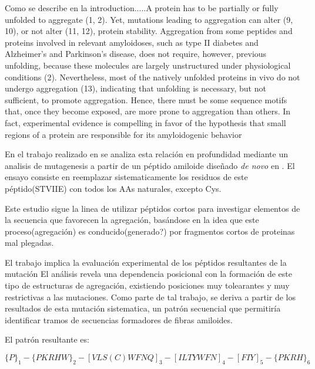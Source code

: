 Como se describe en la introduction.....A protein has to be partially or fully unfolded to aggregate (1, 2).
Yet, mutations leading to aggregation can alter (9, 10), or not alter (11, 12), protein stability. 
Aggregation from some peptides and proteins involved in relevant amyloidoses, such as type II diabetes and Alzheimer’s and Parkinson’s disease, does not require, however, previous unfolding, because these molecules are largely
unstructured under physiological conditions (2). 
Nevertheless, most of the natively unfolded proteins in vivo do not undergo aggregation (13), indicating that unfolding is necessary, but not sufficient, to promote aggregation. 
Hence, there must be some sequence motifs that, once they become exposed, are more prone to aggregation than others. 
In fact, experimental evidence is compelling in favor of the hypothesis that small regions of a protein are responsible for its amyloidogenic behavior

En el trabajo realizado en \cite{de2004sequence} se analiza esta relación %
en profundidad mediante un analisis de mutagenesis a partir de un péptido amiloide diseñado \textit{de novo} en \cite{de2002novo}. 
El ensayo consiste en reemplazar sistematicamente los residuos de este péptido(STVIIE) con todos los AAs naturales, excepto Cys.

Este estudio sigue la linea de utilizar péptidos cortos para investigar elementos de la secuencia que favorecen la agregación, 
basándose en la idea que este proceso(agregación) es conducido(generado?) por fragmentos cortos de proteinas mal plegadas.

El trabajo implica la evaluación experimental de los péptidos resultantes de la mutación
El análisis revela una dependencia posicional con la formación de este tipo de estructuras de agregación, existiendo posiciones muy tolearantes y muy restrictivas a las mutaciones.
Como parte de tal trabajo, se deriva a partir de los resultados de esta mutación sistematica, un patrón secuencial que permitiría identificar tramos de secuencias formadores de fibras amiloides.

El patrón resultante es:

$\{P\}_1 -\{PKRHW\}_2 -[VLS(C)WFNQ]_3 -[ILTYWFN]_4 -[FIY]_5- \{PKRH\}_6 $

